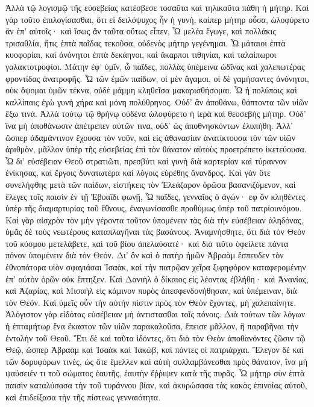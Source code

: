Ἀλλὰ τῷ λογισμῷ τῆς εὐσεβείας κατέσβεσε τοσαῦτα καὶ τηλικαῦτα πάθη ἡ μήτηρ. 
Καὶ γὰρ τοῦτο ἐπιλογίσασθαι, ὅτι εἰ δειλόψυχος ἦν ἡ γυνὴ, καίπερ μήτηρ οὖσα, ὠλοφύρετο ἂν ἐπ' αὐτοῖς· καὶ ἴσως ἄν ταῦτα οὕτως εἶπεν, 
Ὦ μελέα ἔγωγε, καὶ πολλάκις τρισαθλία, ἥτις ἑπτὰ παῖδας τεκοῦσα, οὐδενὸς μήτηρ γεγένημαι. 
Ὦ μάταιοι ἐπτὰ κυοφορίαι, καὶ ἀνόνητοι ἐπτὰ δεκάηνοι, καὶ ἄκαρποι τιθηνίαι, καὶ ταλαίπωροι γαλακτοτροφίοι. 
Μάτην ἐφ' ὑμῖν, ὦ παῖδες, πολλὰς ὑπέμεινα ὠδῖνας καὶ χαλεπωτέρας φροντίδας ἀνατροφῆς. 
Ὦ τῶν ἐμῶν παίδων, οἱ μὲν ἄγαμοι, οἱ δὲ γαμήσαντες ἀνόνητοι, οὐκ ὄψομαι ὑμῶν τέκνα, οὐδὲ μάμμη κληθεῖσα μακαρισθήσομαι. 
Ὦ ἡ πολύπαις καὶ καλλίπαις ἐγὼ γυνὴ χήρα καὶ μόνη πολύθρηνος. 
Οὐδ' ἂν ἀποθάνω, θάπτοντα τῶν υἱῶν ἕξω τινά. 
Ἀλλὰ τούτῳ τῷ θρήνῳ οὐδένα ὠλοφύρετο ἡ ἱερὰ καὶ θεοσεβὴς μήτηρ. Οὐδ' ἵνα μὴ ἀποθάνωσιν ἀπέτρεπεν αὐτῶν τινα, οὐδ' ὡς ἀποθνησκόντων ἐλυπήθη. 
Ἀλλ' ὥσπερ ἀδαμάντινον ἔχουσα τὸν νοῦν, καὶ εἰς ἀθανασίαν ἀνατίκτουσα τὸν τῶν υἱῶν ἀριθμὸν, μᾶλλον ὑπὲρ τῆς εὐσεβείας ἐπὶ τὸν θάνατον αὐτοὺς προετρέπετο ἱκετεύουσα. 
Ὦ δι' εὐσέβειαν Θεοῦ στρατιῶτι, πρεσβύτι καὶ γυνὴ διὰ καρτερίαν καὶ τύραννον ἐνίκησας, καὶ ἔργοις δυνατωτέρα καὶ λόγοις εὑρέθης ἄνανδρος. 
Καὶ γὰν ὃτε συνελήφθης μετὰ τῶν παίδων, εἱστήκεις τὸν Ἐλεάζαρον ὁρῶσα βασανιζόμενον, καὶ ἔλεγες τοῖς παισὶν ἐν τῇ Ἑβοαΐδι φωνῇ, 
Ὦ παῖδες, γενναῖος ὁ ἀγών· εφ ὃν κληθέντες ὑπὲρ τῆς διαμαρτυρίας τοῦ ἔθνους, ἐναγωνίσασθε προθύμως ὑπὲρ τοῦ πατρίουνόμου. 
Καὶ γὰρ αἰσχρὸν τὸν μὴν γέροντα τοῦτον ὑπομένειν τὰς διὰ τὴν εὐσέβειαν ἀληδόνας, ὑμᾶς δὲ τοὺς νεωτέρους καταπλαγῆναι τὰς βασάνους. 
Ἀναμνήσθητε, ὅτι διὰ τὸν Θεὸν τοῦ κόσμου μετελάβετε, καὶ τοῦ βίου ἀπελαύσατέ· 
καὶ διὰ τιῦτο ὀφείλετε πάντα πόνον ὑπομένειν διὰ τὸν Θεόν. 
Δι' ὃν καὶ ὁ πατὴρ ἡμῶν Ἁβραὰμ ἔσπευδεν τὸν ἐθνοπάτορα υἱὸν σφαγιάσαι Ἰσαὰκ, καὶ τὴν πατρῷαν χεῖρα ξιφηφόρον καταφερομένην ἐπ' αὐτὸν ὁρῶν οὐκ ἔπτηξεν. 
Καὶ Δανιὴλ ὁ δίκαιος εἰς λέοντας ἐβλήθη· καὶ Ἀνανίας, καὶ Ἀζαρίας, καὶ Μισαὴλ εἰς κάμινον πυρὸς ἀπεσφενδονήθησαν, καὶ ὑπέμειναν, διὰ τὸν Θεόν. 
Καὶ ὑμεῖς οὖν τὴν αὐτὴν πίστιν πρὸς τὸν Θεὸν ἔχοντες, μὴ χαλεπαίνητε. 
Ἀλόγιστον γὰρ εἰδότας εὐσέβειαν μὴ ἀντιστασθαι τοῖς πόνοις. 
Διὰ τούτων τῶν λόγων ἡ ἑπταμήτωρ ἕνα ἕκαστον τῶν υἱῶν παρακαλοῦσα, ἔπεισε μᾶλλον, ἢ παραβῆναι τὴν ἐντολὴν τοῦ Θεοῦ. 
Ἔτι δὲ καὶ ταῦτα ἰδόντες, ὅτι διὰ τὸν Θεὸν ἀποθανόντες ζῶσιν τῷ Θεῷ, ὥσπερ Ἁβραὰμ καὶ Ἰσαὰκ καὶ Ἰακὼβ, καὶ πάντες οἱ πατριάρχαι. 
Ἔλεγον δὲ καὶ τῶν δορυφόρων τινὲς, ὡς ὅτε ἔμελλεν καὶ αὐτὴ συλλαμβάνεσθαι πρὸς θάνατον, ἵνα μὴ ψαύσειέν τι τοῦ σώματος ἑαυτῆς, ἑαυτὴν ἔῤῥιψεν κατὰ τῆς πυρᾶς. 
Ὦ μήτηρ σὺν ἑπτὰ παισὶν καταλύσασα τὴν τοῦ τυράννου βίαν, καὶ ἀκυρώσασα τὰς κακὰς ἐπινοίας αὐτοῦ, καὶ ἐπιδείξασα τὴν τῆς πίστεως γενναιότητα. 
